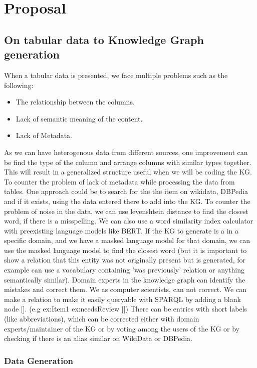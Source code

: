 \documentclass[runningheads]{llncs}
\begin{document}
\section{Proposal}
\subsection{On tabular data to Knowledge Graph generation}

When a tabular data is presented, we face multiple problems such as the following:
\begin{itemize}
    \item The relationship between the columns.
    \item Lack of semantic meaning of the content.
    \item Lack of Metadata.
\end{itemize}

As we can have heterogenous data from different sources, one improvement can be find the type of the column and arrange columns with similar types together.
This will result in a generalized structure useful when we will be coding the KG. 
To counter the problem of lack of metadata while processing the data from tables. One approach could be to search for the the item on wikidata, DBPedia and if 
it exists, using the data entered there to add into the KG.
To counter the problem of noise in the data, we can use levenshtein distance to find the closest word, if there is a misspelling. We can also 
use a word similarity index calculator with preexisting language models like BERT. If the KG to generate is a in a specific domain, and we have a 
masked language model for that domain, we can use the masked language model to find the closest word (but it is important to show a relation that this entity 
was not originally present but is generated, for example can use a vocabulary containing 'was previously' relation or anything semantically similar).
Domain experts in the knowledge graph can identify the mistakes and correct them. We as computer scientists, can not correct. We can make a relation
to make it easily queryable with SPARQL by adding a blank node []. (e.g ex:Item1 ex:needsReview [])
There can be entries with short labels (like abbreviations), which can be corrected either with domain experts/maintainer of the KG or by voting among the users of the KG 
or by checking if there is an alias similar on WikiData or DBPedia.

\subsubsection*{Data Generation}
\end{document}
